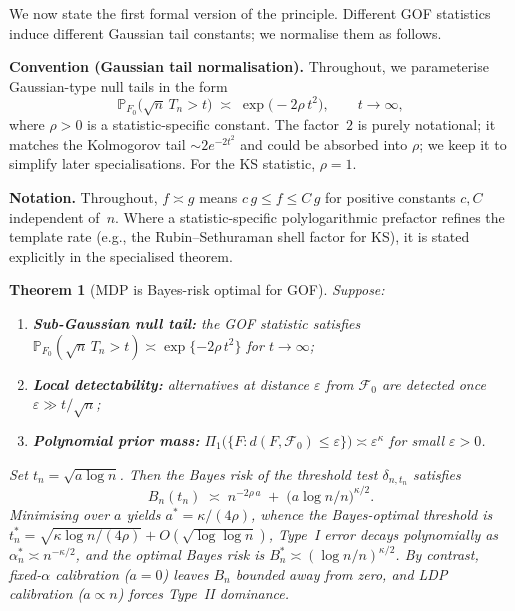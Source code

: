 \documentclass[11pt]{article}
\newcommand{\calF}{\mathcal{F}}
\newcommand{\rhotail}{\rho}  %
\newcommand{\1}{\mathbf{1}}
\newcommand{\PP}{\mathbb{P}}
\theoremstyle{plain}
\newtheorem{theorem}{Theorem}[section]
\theoremstyle{definition}
\theoremstyle{remark}
\begin{document}
We now state the first formal version of the principle.
Different GOF statistics induce different Gaussian tail constants; we normalise them as follows.

%
\begin{mdframed}[style=principleframe]
\noindent\textbf{Convention (Gaussian tail normalisation).}\quad
Throughout, we parameterise Gaussian-type null tails in the form
\begin{equation}\label{eq:tail-convention}
\PP_{F_0}\!\bigl(\sqrt{n}\,T_n > t\bigr) \;\asymp\; \exp\!\bigl(-2\rhotail\,t^{2}\bigr), \qquad t\to\infty,
\end{equation}
where $\rhotail>0$ is a statistic-specific constant.
The factor~$2$ is purely notational; it matches the Kolmogorov tail $\sim 2e^{-2t^2}$ and could be absorbed into $\rhotail$; we keep it to simplify later specialisations.
For the KS statistic, $\rhotail=1$.
\end{mdframed}

\smallskip\noindent\textbf{Notation.} Throughout, $f\asymp g$ means $c\,g\le f\le C\,g$ for positive constants $c,C$ independent of~$n$.
Where a statistic-specific polylogarithmic prefactor refines the template rate (e.g., the Rubin--Sethuraman shell factor for KS), it is stated explicitly in the specialised theorem.

\begin{theorem}[MDP is Bayes-risk optimal for GOF]\label{thm:mdp-generic}
Suppose:
\begin{enumerate}[label=(\roman*),leftmargin=2em]
\item \textbf{Sub-Gaussian null tail:} the GOF statistic satisfies $\PP_{F_0}(\sqrt{n}\,T_n > t) \asymp \exp\{-2\rhotail\,t^2\}$ for $t\to\infty$;
\item \textbf{Local detectability:} alternatives at distance $\varepsilon$ from $\calF_0$ are detected once $\varepsilon \gg t/\sqrt{n}$;
\item \textbf{Polynomial prior mass:} $\Pi_1\!\bigl(\{F : d(F,\calF_0) \le \varepsilon\}\bigr) \asymp \varepsilon^{\kappa}$ for small $\varepsilon > 0$.
\end{enumerate}
Set $t_n = \sqrt{a\log n}$.  Then the Bayes risk of the threshold test $\delta_{n,t_n}$ satisfies
\begin{equation}\label{eq:generic-risk-decomp}
B_n(t_n) \;\asymp\; n^{-2\rhotail\,a} \;+\; \bigl(a\log n / n\bigr)^{\kappa/2}.
\end{equation}
Minimising over $a$ yields $a^{*} = \kappa/(4\rhotail)$, whence
the Bayes-optimal threshold is $t_n^{*} = \sqrt{\kappa\log n/(4\rhotail)} + O(\sqrt{\log\log n})$,
Type~I error decays polynomially as $\alpha_n^{*} \asymp n^{-\kappa/2}$,
and the optimal Bayes risk is $B_n^{*} \asymp (\log n / n)^{\kappa/2}$.
By contrast, fixed-$\alpha$ calibration ($a=0$) leaves $B_n$ bounded away from zero, and LDP calibration ($a \propto n$) forces Type~II dominance.
\end{theorem}
\end{document}
